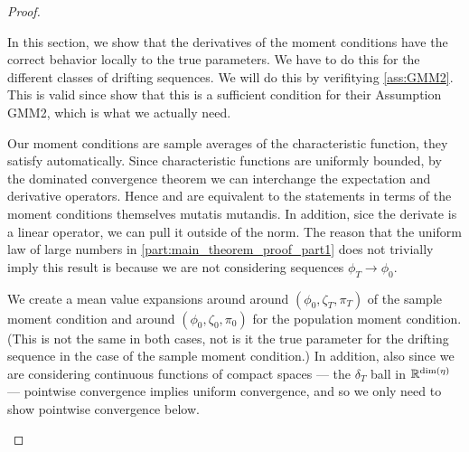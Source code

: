 \documentclass[11pt, letterpaper, twoside, final]{article}
\begin{document}
\begin{appendices}
\begin{proof}
\begin{proofpart}
\end{proofpart}


\begin{proofpart}
    \label{part:mainTheoremProofPart2}

    In this section, we show that the derivatives of the moment conditions have the correct behavior locally to
    the true parameters.
    We have to do this for the different classes of drifting sequences.
    We will do this by verifitying \cref{ass:GMM2}.
    This is valid since \textcite{andrews2014Gmm} show that this is a sufficient condition for their Assumption
    GMM2, which is what we actually need. 

    Our moment conditions are sample averages of the characteristic function, they satisfy 
    automatically. 
    Since characteristic functions are uniformly bounded, by the dominated convergence theorem we can interchange the 
    expectation and derivative operators. 
    Hence  and  are equivalent to the statements in terms of the moment
    conditions themselves mutatis mutandis.  
    In addition, sice the derivate is a linear operator, we can pull it outside of the norm.
    The reason that the uniform law of large numbers in \cref{part:main_theorem_proof_part1} does not trivially
    imply this result is because we are not considering sequences $\phi_T \to \phi_0$. 


    We create a mean value expansions around around $(\phi_0, \zeta_T, \pi_T)$ of the sample moment condition and
    around $(\phi_0, \zeta_0, \pi_0)$ for the population moment condition.
    (This is not the same in both cases, not is it the true parameter for the drifting sequence in the case of the
    sample moment condition.)
    In addition, also since we are considering continuous functions of compact spaces --- the $\delta_T$ ball in
    $\mathbb{R}^{\dim(\eta)}$ --- pointwise convergence implies uniform convergence, and so we only need to show pointwise
    convergence below.


\end{proofpart}
\end{proof}
\end{appendices}
\end{document}
